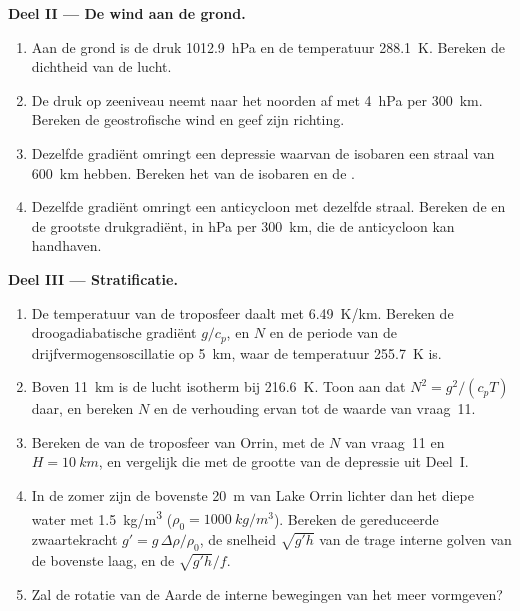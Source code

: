 \begin{problem}
\medskip\noindent\textbf{Deel II --- De wind aan de grond.}
\begin{enumerate}[resume]
\item Aan de grond is de druk \qty{1012.9}{hPa} en de temperatuur
  \qty{288.1}{K}. Bereken de dichtheid van de lucht.
\item De druk op zeeniveau neemt naar het noorden af met \qty{4}{hPa} per
  \qty{300}{km}. Bereken de geostrofische wind en geef zijn richting.
\item Dezelfde gradiënt omringt een depressie waarvan de isobaren een straal
  van \qty{600}{km} hebben. Bereken het  van de isobaren en de
  .
\item Dezelfde gradiënt omringt een anticycloon met dezelfde straal.
  Bereken de  en de grootste drukgradiënt, in
  \unit{hPa} per \qty{300}{km}, die de anticycloon kan handhaven.
\end{enumerate}

\medskip\noindent\textbf{Deel III --- Stratificatie.}
\begin{enumerate}[resume]
\item De temperatuur van de troposfeer daalt met \qty{6.49}{K/km}.
  Bereken de droogadiabatische gradiënt $g/c_p$, en $N$ en de periode van
  de drijfvermogensoscillatie op \qty{5}{km}, waar de temperatuur
  \qty{255.7}{K} is.
\item Boven \qty{11}{km} is de lucht isotherm bij \qty{216.6}{K}. Toon aan dat
  $N^2 = g^2/(c_pT)$ daar, en bereken $N$ en de verhouding ervan tot de waarde van
  vraag~11.
\item Bereken de  van de troposfeer van Orrin, met de $N$ van
  vraag~11 en $H = \qty{10}{km}$, en vergelijk die met de grootte van de
  depressie uit Deel~I.
\item In de zomer zijn de bovenste \qty{20}{m} van Lake Orrin lichter dan
  het diepe water met \qty{1.5}{kg/m^3} ($\rho_0 = \qty{1000}{kg/m^3}$). Bereken
  de gereduceerde zwaartekracht $g' = g\,\Delta\rho/\rho_0$, de snelheid $\sqrt{g'h}$ van
  de trage interne golven van de bovenste laag, en de 
  $\sqrt{g'h}/f$.
\item Zal de rotatie van de Aarde de interne bewegingen van het meer vormgeven?
\end{enumerate}


\end{problem}
